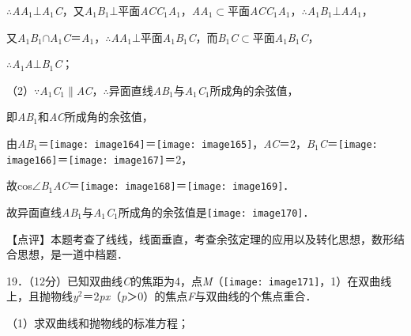 \documentclass[a4paper,11pt,UTF8,twoside]{ctexart} %
\begin{document}
$\mathrm{\therefore}$\textit{AA}${}_{1}$$\mathrm{\bot}$\textit{A}${}_{1}$\textit{C}，又\textit{A}${}_{1}$\textit{B}${}_{1}$$\mathrm{\bot}$平面\textit{ACC}${}_{1}$\textit{A}${}_{1}$，\textit{AA}${}_{1}$$\mathrm{\subset }$平面\textit{ACC}${}_{1}$\textit{A}${}_{1}$，$\mathrm{\therefore}$\textit{A}${}_{1}$\textit{B}${}_{1}$$\mathrm{\bot}$\textit{AA}${}_{1}$，

又\textit{A}${}_{1}$\textit{B}${}_{1}$$\mathrm{\cap}$\textit{A}${}_{1}$\textit{C}＝\textit{A}${}_{1}$，$\mathrm{\therefore}$\textit{AA}${}_{1}$$\mathrm{\bot}$平面\textit{A}${}_{1}$\textit{B}${}_{1}$\textit{C}，而\textit{B}${}_{1}$\textit{C}$\mathrm{\subset }$平面\textit{A}${}_{1}$\textit{B}${}_{1}$\textit{C}，

$\mathrm{\therefore}$\textit{A}${}_{1}$\textit{A}$\mathrm{\bot}$\textit{B}${}_{1}$\textit{C}；

（2）$\mathrm{\because}$\textit{A}${}_{1}$\textit{C}${}_{1}$$\mathrm{\parallel}$\textit{AC}，$\mathrm{\therefore}$异面直线\textit{AB}${}_{1}$与\textit{A}${}_{1}$\textit{C}${}_{1}$所成角的余弦值，

即\textit{AB}${}_{1}$和\textit{AC}所成角的余弦值，

由\textit{AB}${}_{1}$＝\texttt{[image: image164]}＝\texttt{[image: image165]}，\textit{AC}＝2，\textit{B}${}_{1}$\textit{C}＝\texttt{[image: image166]}＝\texttt{[image: image167]}＝2，

故cos$\mathrm{\angle}$\textit{B}${}_{1}$\textit{AC}＝\texttt{[image: image168]}＝\texttt{[image: image169]}．

故异面直线\textit{AB}${}_{1}$与\textit{A}${}_{1}$\textit{C}${}_{1}$所成角的余弦值是\texttt{[image: image170]}．

【点评】本题考查了线线，线面垂直，考查余弦定理的应用以及转化思想，数形结合思想，是一道中档题．

19．（12分）已知双曲线\textit{C}的焦距为4，点\textit{M}（\texttt{[image: image171]}，1）在双曲线上，且抛物线\textit{y}${}^{2}$＝2\textit{px}（\textit{p}＞0）的焦点\textit{F}与双曲线的个焦点重合．

（1）求双曲线和抛物线的标准方程；
\end{document}
